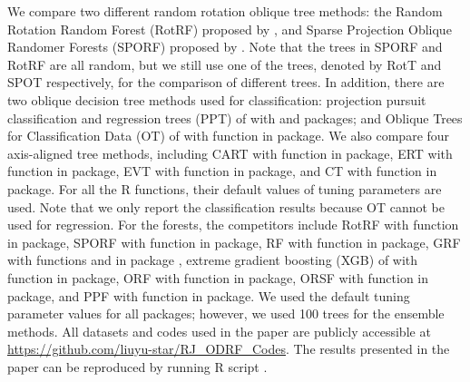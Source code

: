 We compare two different random rotation oblique tree methods: the Random Rotation Random Forest ({RotRF}) proposed by \cite{blaser2016random}, and Sparse Projection Oblique Randomer Forests ({SPORF}) proposed by \cite{tomita2020sparse}.  Note that the trees in  SPORF and RotRF are all random, but we still use one of the trees, denoted by   {RotT} and {SPOT} respectively, for the comparison of different trees. In addition, there are two oblique decision tree methods used for classification: {projection pursuit classification and regression trees (PPT) of \cite{lee2018pptreeviz,PPTreg} with  and  packages;} and Oblique Trees for Classification Data (OT) of  \cite{truong2009fast} with function  in  package.  We also compare four axis-aligned tree methods, including {CART} with function  in  package, {ERT} with function  in  package, {EVT} with function  in  package, and {CT} with function  in  package. 	For all the R functions, their default values of tuning parameters are used. Note that we only report the classification results because {OT} cannot be used for regression.  For the forests, the competitors include RotRF with function  in  package,  {SPORF} with function  in  package, {RF} with function  in  package, {GRF} with functions  and   in package , extreme gradient boosting ({XGB}) of \cite{chen2016xgboost}  with function  in  package, {ORF} with function   in  package, {{ORSF} with function   in  package}, and {PPF} with function  in  package. We used the default tuning parameter values for all packages; however, we used 100 trees for the ensemble methods. All datasets and codes used in the paper are publicly accessible at \url{https://github.com/liuyu-star/RJ_ODRF_Codes}. The results presented in the paper can be reproduced by running R script .

